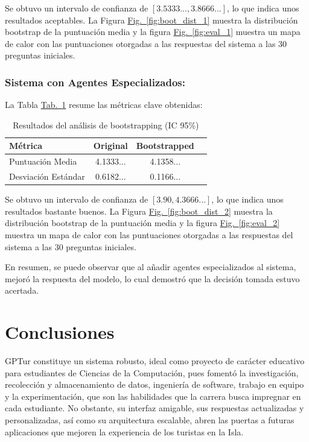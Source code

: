 \documentclass[10pt]{llncs}
\newcommand{\figref}[1]{\hyperref[#1]{Fig.~\ref*{#1}}}
\newcommand{\tabref}[1]{\hyperref[#1]{Tab.~\ref*{#1}}}
\begin{document}
\begin{remark}
Se obtuvo un intervalo de confianza de $[3.5333..., 3.8666...]$, lo que indica unos resultados aceptables. 
La Figura {\figref{fig:boot_dist_1}} muestra la distribución bootstrap de la puntuación media y la figura
{\figref{fig:eval_1}} muestra un mapa de calor con las puntuaciones otorgadas a las respuestas del sistema a las 
30 preguntas iniciales.
\end{remark}

\subsubsection{Sistema con Agentes Especializados:}

La Tabla \tabref{tab:boot_results_2} resume las métricas clave obtenidas:

\begin{table}[h]
\centering
\caption{Resultados del análisis de bootstrapping (IC 95\%)}
\label{tab:boot_results_2}
\begin{tabular}{lccc}
\hline
\textbf{Métrica} & \textbf{Original} & \textbf{Bootstrapped}  \\
\hline 
Puntuación Media& 4.1333... & 4.1358...  \\
Desviación Estándar & 0.6182... & 0.1166...  \\
\hline
\end{tabular}
\end{table}

\begin{remark}
Se obtuvo un intervalo de confianza de $[3.90,4.3666...]$, lo que indica unos resultados bastante buenos. 
La Figura {\figref{fig:boot_dist_2}} muestra la distribución bootstrap de la puntuación media y la figura 
{\figref{fig:eval_2}} muestra un mapa de calor con las puntuaciones otorgadas a las respuestas del sistema a las 
30 preguntas iniciales.
\end{remark}

En resumen, se puede observar que al añadir agentes especializados al sistema, mejoró la respuesta del modelo, lo cual demostró 
que la decisión tomada estuvo acertada.

\vspace{\baselineskip}
\section{Conclusiones}


GPTur constituye un sistema robusto, ideal como proyecto de carácter educativo para estudiantes de Ciencias de la Computación, pues fomentó 
la investigación, recolección y almacenamiento de datos, ingeniería de software, trabajo en equipo y la experimentación, que son las habilidades que la carrera busca impregnar en cada 
estudiante. No obstante, su interfaz amigable, sus respuestas actualizadas y personalizadas, así como su arquitectura escalable, abren las puertas a futuras aplicaciones que mejoren la experiencia de los turistas en la Isla.
\end{document}

